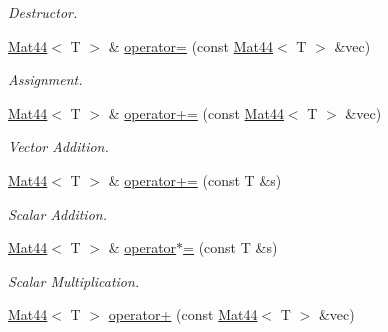 \begin{DoxyCompactItemize}
\begin{DoxyCompactList}\small\item\em Destructor. \item\end{DoxyCompactList}\item 
\hypertarget{classMath_1_1Mat44_aac083fc8de7b90b24a77bf662ef2fad0}{
\hyperlink{classMath_1_1Mat44}{Mat44}$<$ T $>$ \& \hyperlink{classMath_1_1Mat44_aac083fc8de7b90b24a77bf662ef2fad0}{operator=} (const \hyperlink{classMath_1_1Mat44}{Mat44}$<$ T $>$ \&vec)}
\label{classMath_1_1Mat44_aac083fc8de7b90b24a77bf662ef2fad0}

\begin{DoxyCompactList}\small\item\em Assignment. \item\end{DoxyCompactList}\item 
\hypertarget{classMath_1_1Mat44_adfc04ffd0dd5237e26e78773a3ce1fc7}{
\hyperlink{classMath_1_1Mat44}{Mat44}$<$ T $>$ \& \hyperlink{classMath_1_1Mat44_adfc04ffd0dd5237e26e78773a3ce1fc7}{operator+=} (const \hyperlink{classMath_1_1Mat44}{Mat44}$<$ T $>$ \&vec)}
\label{classMath_1_1Mat44_adfc04ffd0dd5237e26e78773a3ce1fc7}

\begin{DoxyCompactList}\small\item\em Vector Addition. \item\end{DoxyCompactList}\item 
\hypertarget{classMath_1_1Mat44_a13d04187acdd1b36e34d49b8712e9a3a}{
\hyperlink{classMath_1_1Mat44}{Mat44}$<$ T $>$ \& \hyperlink{classMath_1_1Mat44_a13d04187acdd1b36e34d49b8712e9a3a}{operator+=} (const T \&s)}
\label{classMath_1_1Mat44_a13d04187acdd1b36e34d49b8712e9a3a}

\begin{DoxyCompactList}\small\item\em Scalar Addition. \item\end{DoxyCompactList}\item 
\hypertarget{classMath_1_1Mat44_a0d9e600e81bdb81e116a1644fa54e330}{
\hyperlink{classMath_1_1Mat44}{Mat44}$<$ T $>$ \& \hyperlink{classMath_1_1Mat44_a0d9e600e81bdb81e116a1644fa54e330}{operator$\ast$=} (const T \&s)}
\label{classMath_1_1Mat44_a0d9e600e81bdb81e116a1644fa54e330}

\begin{DoxyCompactList}\small\item\em Scalar Multiplication. \item\end{DoxyCompactList}\item 
\hypertarget{classMath_1_1Mat44_ac2f0940e1d131cd9e960cc57ff2266ef}{
\hyperlink{classMath_1_1Mat44}{Mat44}$<$ T $>$ \hyperlink{classMath_1_1Mat44_ac2f0940e1d131cd9e960cc57ff2266ef}{operator+} (const \hyperlink{classMath_1_1Mat44}{Mat44}$<$ T $>$ \&vec)}
\label{classMath_1_1Mat44_ac2f0940e1d131cd9e960cc57ff2266ef}


\end{DoxyCompactItemize}
